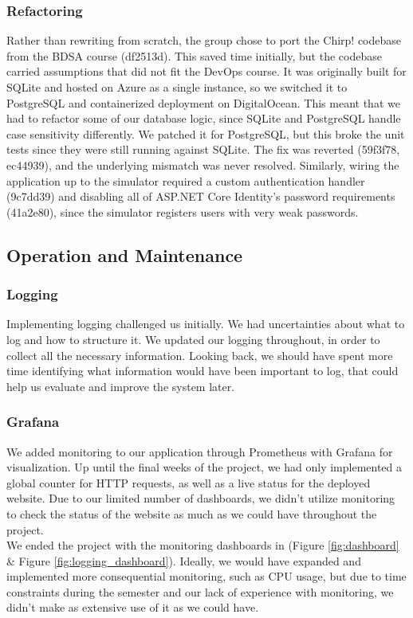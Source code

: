 \subsubsection{Refactoring}
Rather than rewriting from scratch, the group chose to port the Chirp! codebase from the BDSA course (df2513d). This saved time initially, but the codebase carried assumptions that did not fit the DevOps course. It was originally built for SQLite and hosted on Azure as a single instance, so we switched it to PostgreSQL and containerized deployment on DigitalOcean. This meant that we had to refactor some of our database logic, since SQLite and PostgreSQL handle case sensitivity differently. We patched it for PostgreSQL, but this broke the unit tests since they were still running against SQLite. The fix was reverted (59f3f78, ec44939), and the underlying mismatch was never resolved. Similarly, wiring the application up to the simulator required a custom authentication handler (9c7dd39) and disabling all of ASP.NET Core Identity's password requirements (41a2e80), since the simulator registers users with very weak passwords.

\subsection{Operation and Maintenance}

\subsubsection{Logging}
Implementing logging challenged us initially. We had uncertainties about what to log and how to structure it.
We updated our logging throughout, in order to collect all the necessary information. 
Looking back, we should have spent more time identifying what information would have been important to log, that could help us evaluate and improve the system later.

\subsubsection{Grafana}
We added monitoring to our application through Prometheus with Grafana for visualization. Up until the final weeks of the project, we had only implemented a global counter for HTTP requests, as well as a live status for the deployed website. Due to our limited number of dashboards, we didn't utilize monitoring to check the status of the website as much as we could have throughout the project. \\
We ended the project with the monitoring dashboards in (Figure \ref{fig:dashboard} \& Figure \ref{fig:logging_dashboard}). Ideally, we would have expanded and implemented more consequential monitoring, such as CPU usage, but due to time constraints during the semester and our lack of experience with monitoring, we didn't make as extensive use of it as we could have.

